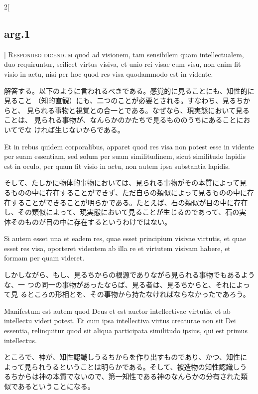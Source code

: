 \documentclass[paper=a4paper,fontsize=10pt,jafontsize=9pt,titlepage]{jlreq}
\begin{document}
\begin{paracol}{2}[\subsection{arg.1}]
{\scshape Respondeo dicendum} quod ad visionem, tam sensibilem quam
intellectualem, duo requiruntur, scilicet virtus visiva, et unio rei
visae cum visu, non enim fit visio in actu, nisi per hoc quod res visa
quodammodo est in vidente.

\switchcolumn

解答する。以下のように言われるべきである。感覚的に見ることにも、知性的に見ること
（知的直観）にも、二つのことが必要とされる。すなわち、見るちからと、
見られる事物と視覚との合一とである。なぜなら、現実態において見ることは、
見られる事物が、なんらかのかたちで見るもののうちにあることにおいてでな
ければ生じないからである。

\switchcolumn*

Et in rebus quidem corporalibus, apparet
quod res visa non potest esse in vidente per suam essentiam, sed solum
per suam similitudinem, sicut similitudo lapidis est in oculo, per
quam fit visio in actu, non autem ipsa substantia lapidis.

\switchcolumn

そして、たしかに物体的事物においては、見られる事物がその本質によって見
るものの中に存在することができず、ただ自らの類似によって見るものの中に存
在することができることが明らかである。たとえば、石の類似が目の中に存在
し、その類似によって、現実態において見ることが生じるのであって、石の実
体そのものが目の中に存在するというわけではない。

\switchcolumn*

Si autem
esset una et eadem res, quae esset principium visivae virtutis, et
quae esset res visa, oporteret videntem ab illa re et virtutem visivam
habere, et formam per quam videret.

\switchcolumn

しかしながら、もし、見るちからの根源でありながら見られる事物でもあるような、一
つの同一の事物があったならば、見る者は、見るちからと、それによって見
るところの形相とを、その事物から持たなければならなかったであろう。

\switchcolumn*

Manifestum est autem quod Deus et est auctor intellectivae virtutis,
et ab intellectu videri potest. Et cum ipsa intellectiva virtus
creaturae non sit Dei essentia, relinquitur quod sit aliqua
participata similitudo ipsius, qui est primus intellectus.

\switchcolumn

ところで、神が、知性認識しうるちからを作り出すものであり、かつ、知性に
よって見られうるということは明らかである。そして、被造物の知性認識しう
るちからは神の本質でないので、第一知性である神のなんらかの分有された類
似であるということになる。


\end{paracol}
\end{document}
